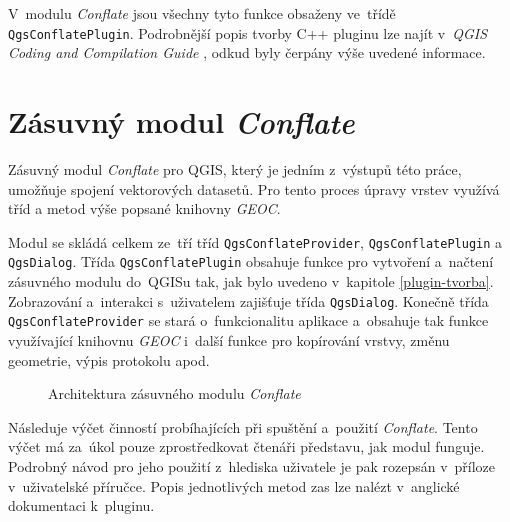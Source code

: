 V~modulu \textit{Conflate} jsou všechny tyto funkce obsaženy ve~třídě
\texttt{Qgs\-Con\-flate\-Plugin}. 
Podrobnější popis tvorby C++ pluginu lze najít v~\textit{QGIS Coding and 
Compilation Guide} %
, odkud byly čerpány výše uvedené informace.




\section{Zásuvný modul \textit{Conflate}}
\label{plugin-navrh}

Zásuvný modul \textit{Conflate} pro QGIS, který je jedním z~výstupů této práce,
umožňuje spojení vektorových datasetů. Pro tento proces úpravy vrstev využívá
tříd a metod výše popsané knihovny \textit{GEOC}.

Modul se skládá celkem ze~tří tříd \texttt{QgsConflateProvider}, 
\texttt{QgsConflatePlugin} a~ \texttt{QgsDialog}. Třída \texttt{QgsConflatePlugin} 
obsahuje funkce pro vytvoření a~načtení zásuvného modulu do~QGISu tak, jak bylo 
uvedeno v~kapitole \ref{plugin-tvorba}. Zobrazování a~interakci s~uživatelem 
zajišťuje třída \texttt{QgsDialog}. Konečně třída \texttt{QgsConflateProvider} 
se stará o~funkcionalitu aplikace a~obsahuje tak funkce využívající knihovnu 
\textit{GEOC} i~další funkce pro kopírování vrstvy, změnu geometrie, výpis 
protokolu apod.

\vspace{0.5cm}
\label{schema}
  \begin{figure}[h]
    \centering
      
      \caption{Architektura zásuvného modulu \textit{Conflate}}
      \label{fig:schema}
  \end{figure} 


Následuje výčet činností probíhajících při spuštění a~použití \textit{Conflate}.
Tento výčet má za~úkol pouze zprostředkovat čtenáři představu, jak modul funguje.
Podrobný návod pro jeho použití z~hlediska uživatele je pak rozepsán v~příloze
v~uživatelské příručce. Popis jednotlivých metod zas lze nalézt v~anglické
dokumentaci k~pluginu. %

